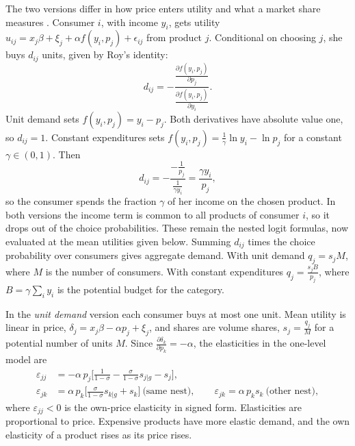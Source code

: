 The two versions differ in how price enters utility and what a
market share measures \citep[Section 3.1]{BjornerstedtVerboven2013}. Consumer $i$, with income $y_i$, gets utility
$u_{ij}=x_j\beta+\xi_j+\alpha f(y_i,p_j)+\epsilon_{ij}$ from product $j$. Conditional on choosing $j$, she buys
$d_{ij}$ units, given by Roy's identity:
\begin{equation*}
d_{ij}=-\dfrac{\frac{\partial f(y_i,p_j)}{\partial p_j}}{\frac{\partial f(y_i,p_j)}{\partial y_i}} .
\end{equation*}
Unit demand sets $f(y_i,p_j)=y_i-p_j$. Both derivatives have absolute value one, so $d_{ij}=1$. Constant
expenditures sets $f(y_i,p_j)=\frac{1}{\gamma}\ln y_i-\ln p_j$ for a constant $\gamma\in(0,1)$. Then
\begin{equation*}
d_{ij}=-\dfrac{-\frac{1}{p_j}}{\frac{1}{\gamma y_i}}=\frac{\gamma y_i}{p_j},
\end{equation*}
so the consumer spends the fraction $\gamma$ of her income on the chosen product. In both versions the income term
is common to all products of consumer $i$, so it drops out of the choice probabilities. These remain the nested logit
formulas, now evaluated at the mean utilities given below. Summing $d_{ij}$ times the choice probability over
consumers gives aggregate demand. With unit demand $q_j=s_jM$, where $M$ is the number of consumers. With constant
expenditures $q_j=\frac{s_jB}{p_j}$, where $B=\gamma\sum_iy_i$ is the potential budget for the category.

In the \emph{unit demand} version each consumer buys at most one unit. Mean utility is linear in price,
$\delta_j=x_j\beta-\alpha p_j+\xi_j$, and shares are volume shares, $s_j=\frac{q_j}{M}$ for a potential number of
units $M$. Since $\frac{\partial\delta_k}{\partial p_k}=-\alpha$, the elasticities in the one-level model are
\begin{align}
\varepsilon_{jj}&=-\alpha\,p_j\Big[\frac{1}{1-\sigma}-\frac{\sigma}{1-\sigma}s_{j|g}-s_j\Big],\label{eq:11-unit-own}\\
\varepsilon_{jk}&=\alpha\,p_k\Big[\frac{\sigma}{1-\sigma}s_{k|g}+s_k\Big]\ \text{(same nest)},\qquad
\varepsilon_{jk}=\alpha\,p_ks_k\ \text{(other nest)},\nonumber
\end{align}
where $\varepsilon_{jj}<0$ is the own-price elasticity in signed form. Elasticities are proportional to price.
Expensive products have more elastic demand, and the own elasticity of a product rises as its price rises.

